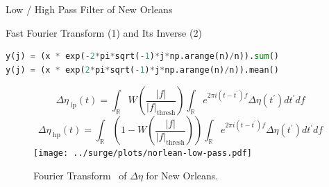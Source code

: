 \begin{frame}[fragile]{Low / High Pass Filter of New Orleans }
\vspace{-10pt}
\begin{block}{Fast Fourier Transform (1) and Its Inverse (2)}
\vspace{-10pt}
\begin{lstlisting}[firstnumber=1, language=python, label=glabels, xleftmargin=0pt]
y(j) = (x * exp(-2*pi*sqrt(-1)*j*np.arange(n)/n)).sum()
y(j) = (x * exp(2*pi*sqrt(-1)*j*np.arange(n)/n)).mean()
\end{lstlisting}
\end{block}
\vspace{-30pt}
\begin{figure}[htb!]
\begin{equation}
\Delta\eta_{\;\mathrm{lp}}(t) = \int_{\mathbb{R}}W\left(\frac{|f|}
{|f|_{\mathrm{thresh}}}\right)\int_{\mathbb{R}}e^{2\pi i
(t-t^{\prime})f }\Delta \eta(t^{\prime})dt^{\prime}df
\end{equation}
\begin{equation}
\Delta\eta_{\;\mathrm{hp}}(t) = \int_{\mathbb{R}}\left(1-W\left(\frac{|f|}
{|f|_{\mathrm{thresh}}}\right)\right)\int_{\mathbb{R}}e^{2\pi i
(t-t^{\prime})f }\Delta \eta(t^{\prime})dt^{\prime}df
\end{equation}
    \centering
    \texttt{[image: ../surge/plots/norlean-low-pass.pdf]}
    \vspace{-15pt}
    \caption{Fourier Transform~\cite{cooley1965algorithm} of $\Delta\eta$ for New Orleans.}
    \label{fig:A}
\end{figure}
\end{frame}

